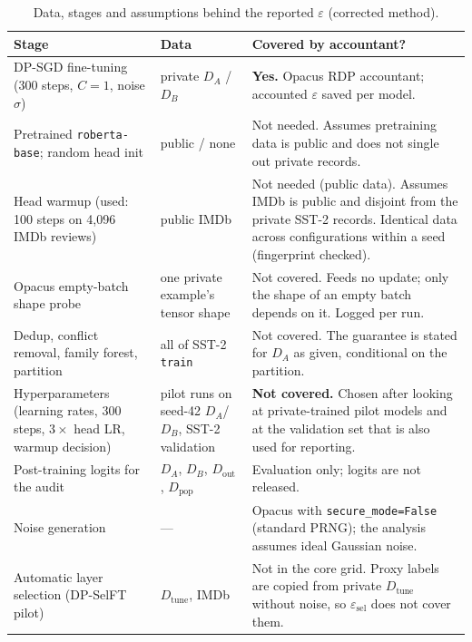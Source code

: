 \documentclass[11pt,a4paper]{article}
\begin{document}
\begin{table}[htbp]
\centering
\small
\caption{Data, stages and assumptions behind the reported $\varepsilon$ (corrected method).}
\label{tab:coverage}
\setlength{\tabcolsep}{4pt}
\begin{tabularx}{\textwidth}{@{}>{\RaggedRight\arraybackslash}p{3.6cm} >{\RaggedRight\arraybackslash}p{3.2cm} >{\RaggedRight\arraybackslash}X@{}}
\toprule
\textbf{Stage} & \textbf{Data} & \textbf{Covered by accountant?} \\
\midrule
DP-SGD fine-tuning (300 steps, $C{=}1$, noise $\sigma$) & private $D_A$ / $D_B$ & \textbf{Yes.} Opacus RDP accountant; accounted $\varepsilon$ saved per model. \\
\rowcolor{rowgray}
Pretrained \texttt{roberta-base}; random head init & public / none & Not needed. Assumes pretraining data is public and does not single out private records. \\
Head warmup (used: 100 steps on 4{,}096 IMDb reviews) & public IMDb & Not needed (public data). Assumes IMDb is public and disjoint from the private SST-2 records. Identical data across configurations within a seed (fingerprint checked). \\
\rowcolor{rowgray}
Opacus empty-batch shape probe & one private example's tensor shape & Not covered. Feeds no update; only the shape of an empty batch depends on it. Logged per run. \\
Dedup, conflict removal, family forest, partition & all of SST-2 \texttt{train} & Not covered. The guarantee is stated for $D_A$ as given, conditional on the partition. \\
\rowcolor{rowgray}
Hyperparameters (learning rates, 300 steps, $3\times$ head LR, warmup decision) & pilot runs on seed-42 $D_A$/$D_B$, SST-2 validation & \textbf{Not covered.} Chosen after looking at private-trained pilot models and at the validation set that is also used for reporting. \\
Post-training logits for the audit & $D_A$, $D_B$, $D_{\text{out}}$, $D_{\text{pop}}$ & Evaluation only; logits are not released. \\
\rowcolor{rowgray}
Noise generation & --- & Opacus with \texttt{secure\_mode=False} (standard PRNG); the analysis assumes ideal Gaussian noise. \\
Automatic layer selection (DP-SelFT pilot) & $D_{\text{tune}}$, IMDb & Not in the core grid. Proxy labels are copied from private $D_{\text{tune}}$ without noise, so $\varepsilon_{\text{sel}}$ does not cover them. \\
\bottomrule
\end{tabularx}
\end{table}
\end{document}
